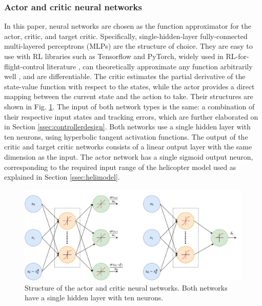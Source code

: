 \subsubsection{Actor and critic neural networks} \label{ssec:neuralnetworks}
In this paper, neural networks are chosen as the function approximator for the actor, critic, and target critic. Specifically, single-hidden-layer fully-connected multi-layered perceptrons (MLPs) are the structure of choice. They are easy to use with RL libraries such as Tensorflow and PyTorch, widely used in RL-for-flight-control literature \cite{Bertsekas2000, Enns2002, Enns2003a, Enns2003b, Ferrari2004, VanKampen2006, Prokhorov1995, Balakrishnan1996, Prokhorov1997, Zhou2016HDP, Zhou2018DHP, Heyer2020}, can theoretically approximate any function arbitrarily well \cite{Hornik1989}, and are differentiable. The critic estimates the partial derivative of the state-value function with respect to the states, while the actor provides a direct mapping between the current state and the action to take. Their structures are shown in Fig. \ref{fig:nn_structure}. The input of both network types is the same: a combination of their respective input states and tracking errors, which are further elaborated on in Section \ref{ssec:controllerdesign}. Both networks use a single hidden layer with ten neurons, using hyperbolic tangent activation functions. The output of the critic and target critic networks consists of a linear output layer with the same dimension as the input. The actor network has a single sigmoid output neuron, corresponding to the required input range of the helicopter model used as explained in Section \ref{ssec:helimodel}.

\begin{figure}[ht]
    \centering
    \includegraphics[width=\textwidth, trim={0 0 0.4cm 0.4cm}, clip]{fig/2/NNs2.pdf}
    \caption{Structure of the actor and critic neural networks. Both networks have a single hidden layer with ten neurons. }
    \label{fig:nn_structure}
\end{figure}


